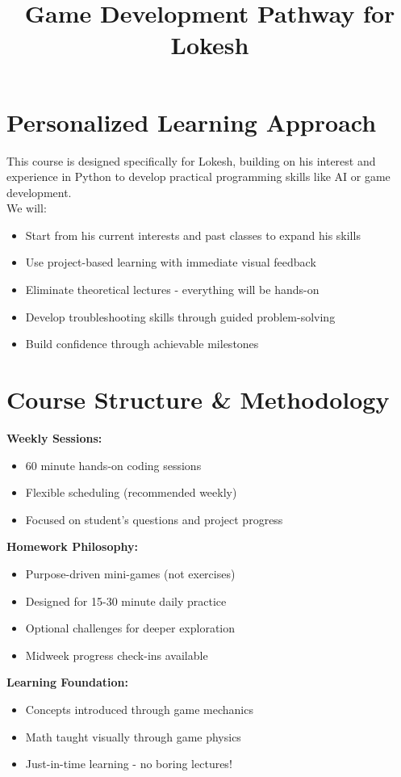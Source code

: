 \documentclass{article}
\title{\vspace{-3em}Game Development Pathway for Lokesh\vspace{-3em}}
\author{}
\begin{document}
\fontsize{14}{16}\selectfont
\maketitle

\section{Personalized Learning Approach}
This course is designed specifically for Lokesh, building on his interest and experience in Python to develop practical programming skills like AI or game development. \\

We will:

\begin{itemize}[leftmargin=*, noitemsep]
    \item Start from his current interests and past classes to expand his skills
    \item Use project-based learning with immediate visual feedback
    \item Eliminate theoretical lectures - everything will be hands-on
    \item Develop troubleshooting skills through guided problem-solving
    \item Build confidence through achievable milestones
\end{itemize}

\section{Course Structure \& Methodology}
\begin{learningblock}
\textbf{Weekly Sessions:} 
\begin{itemize}[noitemsep]
\item 60 minute hands-on coding sessions 
\item Flexible scheduling (recommended weekly)
\item Focused on student's questions and project progress
\end{itemize}

\textbf{Homework Philosophy:}
\begin{itemize}[noitemsep]
\item Purpose-driven mini-games (not exercises)
\item Designed for 15-30 minute daily practice
\item Optional challenges for deeper exploration
\item Midweek progress check-ins available
\end{itemize}

\textbf{Learning Foundation:}
\begin{itemize}[noitemsep]
\item Concepts introduced through game mechanics
\item Math taught visually through game physics
\item Just-in-time learning - no boring lectures!
\end{itemize}
\end{learningblock}
\end{document}

